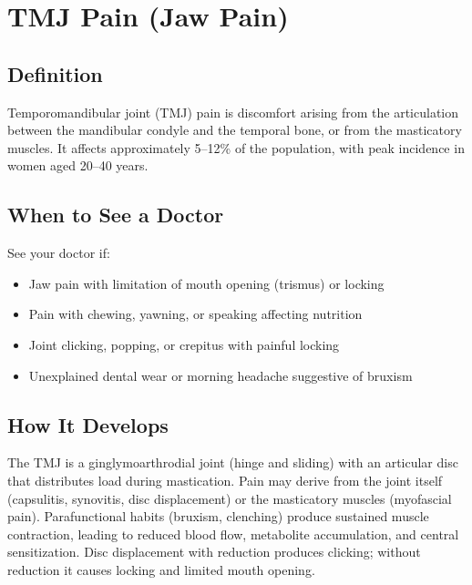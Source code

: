 \chapter{TMJ Pain (Jaw Pain)}

\section*{Definition}
Temporomandibular joint (TMJ) pain is discomfort arising from the articulation between the mandibular condyle and the temporal bone, or from the masticatory muscles. It affects approximately 5--12\% of the population, with peak incidence in women aged 20--40 years.

\section*{When to See a Doctor}
See your doctor if:
\begin{itemize}
  \item Jaw pain with limitation of mouth opening (trismus) or locking
  \item Pain with chewing, yawning, or speaking affecting nutrition
  \item Joint clicking, popping, or crepitus with painful locking
  \item Unexplained dental wear or morning headache suggestive of bruxism
\end{itemize}

\section*{How It Develops}
The TMJ is a ginglymoarthrodial joint (hinge and sliding) with an articular disc that distributes load during mastication. Pain may derive from the joint itself (capsulitis, synovitis, disc displacement) or the masticatory muscles (myofascial pain). Parafunctional habits (bruxism, clenching) produce sustained muscle contraction, leading to reduced blood flow, metabolite accumulation, and central sensitization. Disc displacement with reduction produces clicking; without reduction it causes locking and limited mouth opening.


